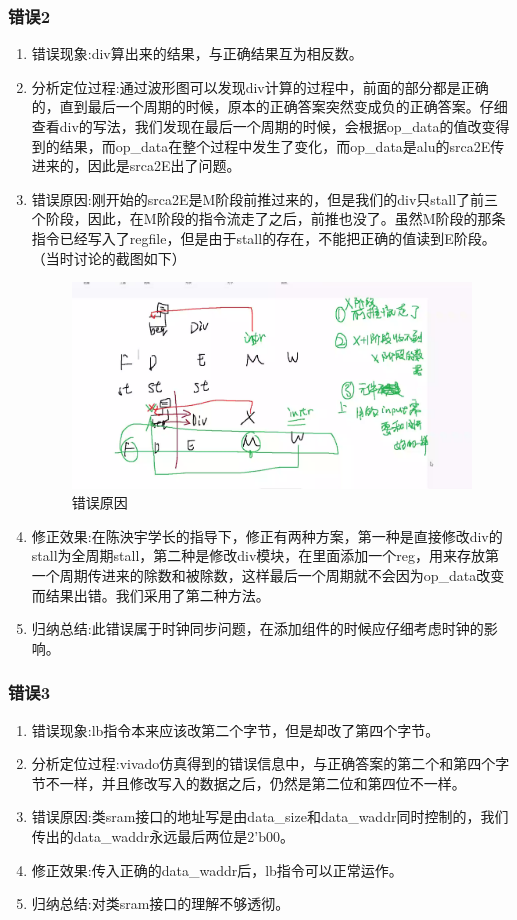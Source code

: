 \subsubsection{错误2}
\begin{enumerate}[(1)]
    \item 错误现象:div算出来的结果，与正确结果互为相反数。
    \item 分析定位过程:通过波形图可以发现div计算的过程中，前面的部分都是正确的，直到最后一个周期的时候，原本的正确答案突然变成负的正确答案。仔细查看div的写法，我们发现在最后一个周期的时候，会根据op\_data的值改变得到的结果，而op\_data在整个过程中发生了变化，而op\_data是alu的srca2E传进来的，因此是srca2E出了问题。
    \item 错误原因:刚开始的srca2E是M阶段前推过来的，但是我们的div只stall了前三个阶段，因此，在M阶段的指令流走了之后，前推也没了。虽然M阶段的那条指令已经写入了regfile，但是由于stall的存在，不能把正确的值读到E阶段。（当时讨论的截图如下）
    \begin{figure}[H]
        \centering
        \includegraphics[width=\textwidth]{image/div.png}
        \caption{错误原因}
        \label{div}
    \end{figure}
    \item 修正效果:在陈泱宇学长的指导下，修正有两种方案，第一种是直接修改div的stall为全周期stall，第二种是修改div模块，在里面添加一个reg，用来存放第一个周期传进来的除数和被除数，这样最后一个周期就不会因为op\_data改变而结果出错。我们采用了第二种方法。
    \item 归纳总结:此错误属于时钟同步问题，在添加组件的时候应仔细考虑时钟的影响。
\end{enumerate}

\subsubsection{错误3}
\begin{enumerate}[(1)]
    \item 错误现象:lb指令本来应该改第二个字节，但是却改了第四个字节。
    \item 分析定位过程:vivado仿真得到的错误信息中，与正确答案的第二个和第四个字节不一样，并且修改写入的数据之后，仍然是第二位和第四位不一样。
    \item 错误原因:类sram接口的地址写是由data\_size和data\_waddr同时控制的，我们传出的data\_waddr永远最后两位是2'b00。
    \item 修正效果:传入正确的data\_waddr后，lb指令可以正常运作。
    \item 归纳总结:对类sram接口的理解不够透彻。
\end{enumerate}

